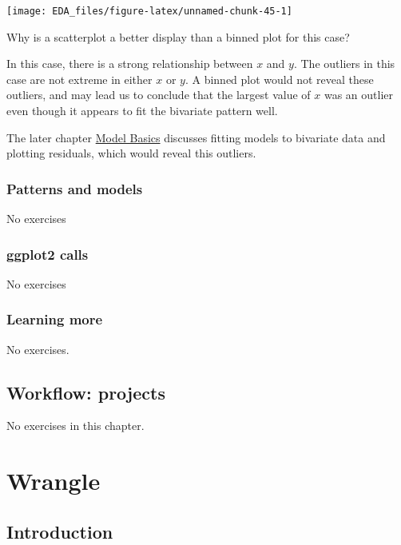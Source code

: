 \documentclass[]{book}
\theoremstyle{plain}
\theoremstyle{remark}
\begin{document}
\begin{center}\texttt{[image: EDA\_files/figure-latex/unnamed-chunk-45-1]} \end{center}

Why is a scatterplot a better display than a binned plot for this case?

In this case, there is a strong relationship between \(x\) and \(y\). The outliers in this case are not extreme in either \(x\) or \(y\).
A binned plot would not reveal these outliers, and may lead us to conclude that the largest value of \(x\) was an outlier even though it appears to fit the bivariate pattern well.

The later chapter \protect\hyperlink{model-basics}{Model Basics} discusses fitting models to bivariate data and plotting residuals, which would reveal this outliers.

\hypertarget{patterns-and-models}{%
\section{Patterns and models}\label{patterns-and-models}}

No exercises

\hypertarget{ggplot2-calls}{%
\section{ggplot2 calls}\label{ggplot2-calls}}

No exercises

\hypertarget{learning-more}{%
\section{Learning more}\label{learning-more}}

No exercises.

\hypertarget{workflow-projects}{%
\chapter{Workflow: projects}\label{workflow-projects}}

No exercises in this chapter.

\hypertarget{part-wrangle}{%
\part{Wrangle}\label{part-wrangle}}

\hypertarget{introduction-4}{%
\chapter{Introduction}\label{introduction-4}}
\end{document}
